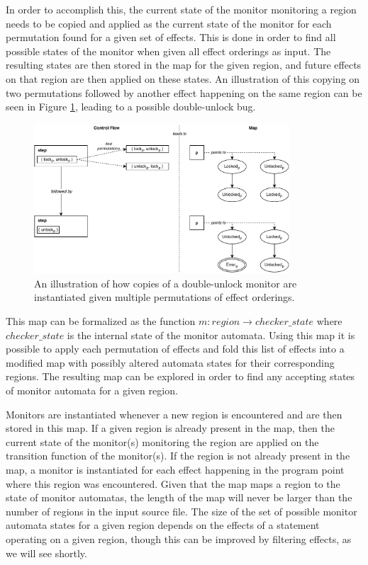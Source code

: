 \noindent In order to accomplish this, the current state of the monitor monitoring a region needs to be copied and applied as the current state of the monitor for each permutation found for a given set of effects.  This is done in order to find all possible states of the monitor when given all effect orderings as input. The resulting states are then stored in the map for the given region, and future effects on that region are then applied on these states. An illustration of this copying on two permutations followed by another effect happening on the same region can be seen in Figure \ref{permutation-copy}, leading to a possible double-unlock bug.

\begin{figure}[H]
    \centering
    \includegraphics[width=0.85\textwidth]{implementation/figures/permutation-copy}
    \caption{An illustration of how copies of a double-unlock monitor are instantiated given multiple permutations of effect orderings.}
    \label{permutation-copy}
\end{figure}

\noindent This map can be formalized as the function $m: region \rightarrow { checker\_state }$ where $ checker\_state $ is the internal state of the monitor automata. Using this map it is possible to apply each permutation of effects and fold this list of effects into a modified map with possibly altered automata states for their corresponding regions. The resulting map can be explored in order to find any accepting states of monitor automata for a given region. 

\newpar Monitors are instantiated whenever a new region is encountered and are then stored in this map. If a given region is already present in the map, then the current state of the monitor(s) monitoring the region are applied on the transition function of the monitor(s). If the region is not already present in the map, a monitor is instantiated for each effect happening in the program point where this region was encountered. Given that the map maps a region to the state of monitor automatas, the length of the map will never be larger than the number of regions in the input source file. The size of the set of possible monitor automata states for a given region depends on the effects of a statement operating on a given region, though this can be improved by filtering effects, as we will see shortly. 

